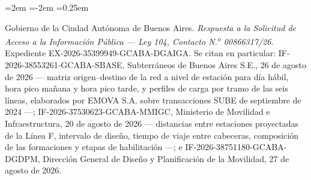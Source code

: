 \documentclass{article}
\begin{document}
\begin{list}{}{\leftmargin=2em \itemindent=-2em \itemsep=0.25em}
\item[] [17] Gobierno de la Ciudad Autónoma de Buenos Aires. \textit{Respuesta a la Solicitud de Acceso a la
  Información Pública --- Ley 104, Contacto N.\textsuperscript{o} 00866317/26}. Expediente
  EX-2026-35399949-GCABA-DGAIGA. Se citan en particular: IF-2026-38553261-GCABA-SBASE, Subterráneos de Buenos
  Aires S.E., 26 de agosto de 2026 --- matriz origen--destino de la red a nivel de estación para día hábil,
  hora pico mañana y hora pico tarde, y perfiles de carga por tramo de las seis líneas, elaborados por EMOVA
  S.A. sobre transacciones SUBE de septiembre de 2024 ---; IF-2026-37530623-GCABA-MMIGC, Ministerio de
  Movilidad e Infraestructura, 20 de agosto de 2026 --- distancias entre estaciones proyectadas de la Línea F,
  intervalo de diseño, tiempo de viaje entre cabeceras, composición de las formaciones y etapas de
  habilitación ---; e IF-2026-38751180-GCABA-DGDPM, Dirección General de Diseño y Planificación de la
  Movilidad, 27 de agosto de 2026.

\end{list}
\end{document}
